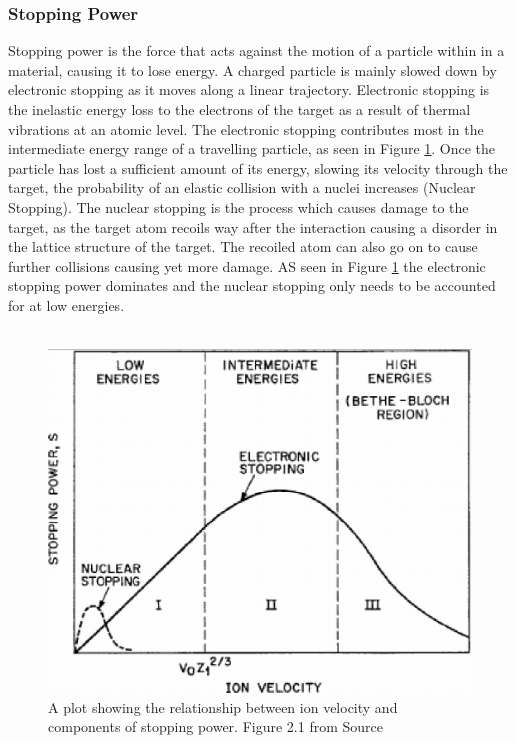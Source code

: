 \documentclass[12pt,a4paper]{article}
\begin{document}
\subsubsection{Stopping Power}
\label{stop}
Stopping power is the force that acts against the motion of a particle within in a material, causing it to lose energy. A charged particle is mainly slowed down by electronic stopping as it moves along a linear trajectory. Electronic stopping is the inelastic energy loss to the electrons of the target as a result of thermal vibrations at an atomic level. The electronic stopping contributes most in the intermediate energy range of a travelling particle, as seen in Figure \ref{stprg}. Once the particle has lost a sufficient amount of its energy, slowing its velocity through the target, the probability of an elastic collision with a nuclei increases (Nuclear Stopping). The nuclear stopping is the process which causes damage to the target, as the target atom recoils way after the interaction causing a disorder in the lattice structure of the target. The recoiled atom can also go on to cause further collisions causing yet more damage. AS seen in Figure \ref{stprg} the electronic stopping power dominates and the nuclear stopping only needs to be accounted for at low energies.
\\\\
\begin{figure}[h!]
\centering
\includegraphics[scale=0.4]{Images//Stopping//stoppingrange.png}
\caption[width=\columnwidth]{A plot showing the relationship between ion velocity and components of stopping power. Figure 2.1 from Source \cite{stprg}}
\label{stprg}
\end{figure}
\end{document}

